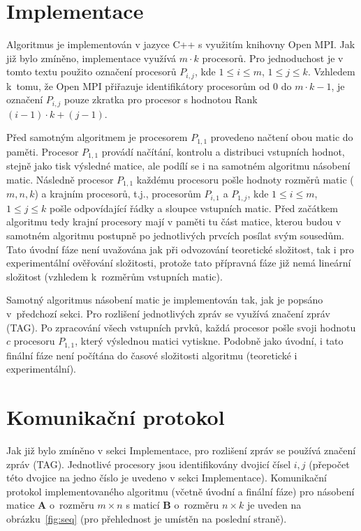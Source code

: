 \documentclass[a4paper,12pt]{article}
\begin{document}
\section{Implementace}
Algoritmus je implementován v jazyce C++ s využitím knihovny Open MPI. Jak již bylo zmíněno, implementace využívá $m\cdot k$ procesorů. 
Pro jednoduchost je v tomto textu použito označení procesorů $P_{i,j}$, kde $1 \leq i \leq m$, $1 \leq j \leq k$. Vzhledem k~tomu, 
že Open MPI přiřazuje identifikátory procesorům od 0 do $m\cdot k-1$, je označení $P_{i,j}$ pouze zkratka pro procesor s hodnotou 
Rank $(i-1)\cdot k+(j-1)$.

Před samotným algoritmem je procesorem $P_{1,1}$ provedeno načtení obou matic do paměti. Procesor $P_{1,1}$ provádí 
načítání, kontrolu a distribuci vstupních hodnot, stejně jako tisk výsledné matice, ale podílí se i na samotném algoritmu 
násobení matic. Následně procesor $P_{1,1}$ každému procesoru pošle hodnoty rozměrů matic ($m,n,k$) a krajním 
procesorů, t.j., procesorům $P_{i,1}$ a $P_{1,j}$, kde $1 \leq i \leq m$, $1 \leq j \leq k$ pošle odpovídající řádky a sloupce vstupních matic. Před začátkem 
algoritmu tedy krajní procesory mají v paměti tu část matice, kterou budou v samotném algoritmu postupně po 
jednotlivých prvcích posílat svým sousedům. Tato úvodní fáze není uvažována jak při odvozování teoretické složitost,
tak i pro experimentální ověřování složitosti, protože tato přípravná fáze již nemá lineární složitost (vzhledem k~rozměrům 
vstupních matic).

Samotný algoritmus násobení matic je implementován tak, jak je popsáno v~předchozí sekci. Pro rozlišení jednotlivých 
zpráv se využívá značení zpráv (TAG). Po zpracování všech vstupních prvků, každá procesor pošle svoji hodnotu $c$ 
procesoru $P_{1,1}$, který výslednou matici vytiskne. Podobně jako úvodní, i tato finální fáze není počítána do 
časové složitosti algoritmu (teoretické i experimentální).

\section{Komunikační protokol}
Jak již bylo zmíněno v sekci Implementace, pro rozlišení zpráv se používá značení zpráv (TAG). Jednotlivé procesory jsou 
identifikovány dvojicí čísel $i,j$ (přepočet této dvojice na jedno číslo je uvedeno v sekci Implementace). Komunikační protokol 
implementovaného algoritmu (včetně úvodní a finální fáze) pro násobení matice $\mathbf{A}$ o~rozměru $m\times n$ s maticí $\mathbf{B}$ 
o~rozměru $n\times k$ je uveden na obrázku~\ref{fig:seq} (pro přehlednost je umístěn na poslední straně).
\end{document}
